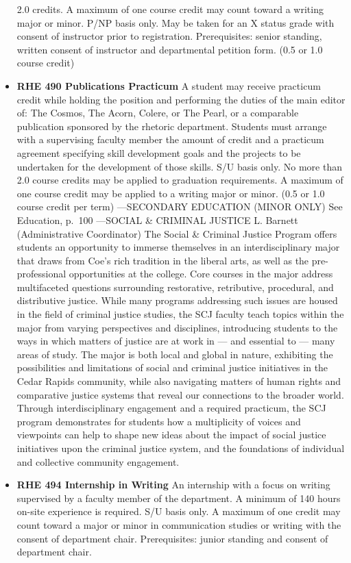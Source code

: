\documentclass[
  letterpaper,
]{scrbook}
\begin{document}
\begin{itemize}
  2.0 credits. A maximum of one course credit may count toward a writing
  major or minor. P/NP basis only. May be taken for an X status grade
  with consent of instructor prior to registration. Prerequisites:
  senior standing, written consent of instructor and departmental
  petition form. (0.5 or 1.0 course credit)\\
\item
  \textbf{RHE 490 Publications Practicum} A student may receive
  practicum credit while holding the position and performing the duties
  of the main editor of: The Cosmos, The Acorn, Colere, or The Pearl, or
  a comparable publication sponsored by the rhetoric department.
  Students must arrange with a supervising faculty member the amount of
  credit and a practicum agreement specifying skill development goals
  and the projects to be undertaken for the development of those skills.
  S/U basis only. No more than 2.0 course credits may be applied to
  graduation requirements. A maximum of one course credit may be applied
  to a writing major or minor. (0.5 or 1.0 course credit per term)
  ---SECONDARY EDUCATION (MINOR ONLY) See Education, p.~100 ---SOCIAL \&
  CRIMINAL JUSTICE L. Barnett (Administrative Coordinator) The Social \&
  Criminal Justice Program offers students an opportunity to immerse
  themselves in an interdisciplinary major that draws from Coe's rich
  tradition in the liberal arts, as well as the pre-professional
  opportunities at the college. Core courses in the major address
  multifaceted questions surrounding restorative, retributive,
  procedural, and distributive justice. While many programs addressing
  such issues are housed in the field of criminal justice studies, the
  SCJ faculty teach topics within the major from varying perspectives
  and disciplines, introducing students to the ways in which matters of
  justice are at work in --- and essential to --- many areas of study.
  The major is both local and global in nature, exhibiting the
  possibilities and limitations of social and criminal justice
  initiatives in the Cedar Rapids community, while also navigating
  matters of human rights and comparative justice systems that reveal
  our connections to the broader world. Through interdisciplinary
  engagement and a required practicum, the SCJ program demonstrates for
  students how a multiplicity of voices and viewpoints can help to shape
  new ideas about the impact of social justice initiatives upon the
  criminal justice system, and the foundations of individual and
  collective community engagement.
\item
  \textbf{RHE 494 Internship in Writing} An internship with a focus on
  writing supervised by a faculty member of the department. A minimum of
  140 hours on-site experience is required. S/U basis only. A maximum of
  one credit may count toward a major or minor in communication studies
  or writing with the consent of department chair. Prerequisites: junior
  standing and consent of department chair.
\end{itemize}
\end{document}
